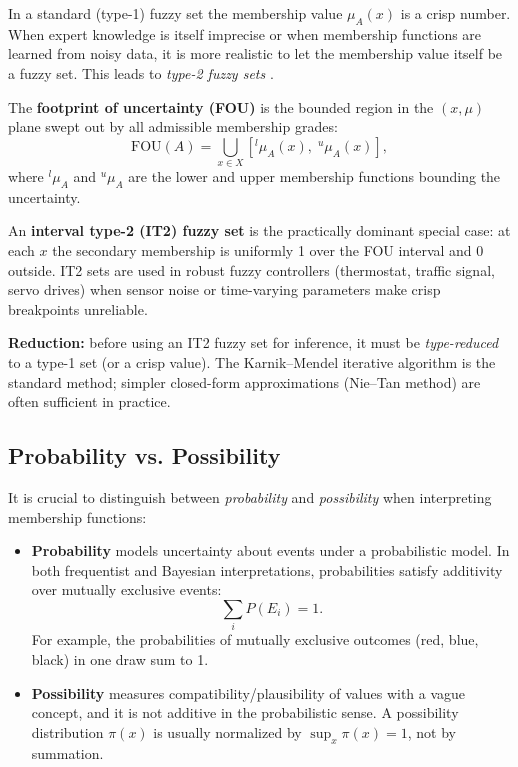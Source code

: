 \begin{tcolorbox}[summarybox, title={Type-2 Fuzzy Sets: handling uncertain membership}]
In a standard (type-1) fuzzy set the membership value \(\mu_A(x)\) is a crisp number. When expert knowledge is itself imprecise or when membership functions are learned from noisy data, it is more realistic to let the membership value itself be a fuzzy set. This leads to \emph{type-2 fuzzy sets} \citep{Zadeh1975}.

The \textbf{footprint of uncertainty (FOU)} is the bounded region in the \((x, \mu)\) plane swept out by all admissible membership grades:
\[
  \text{FOU}(A) = \bigcup_{x \in X} [{}^{l}\mu_A(x),\; {}^{u}\mu_A(x)],
\]
where \({}^{l}\mu_A\) and \({}^{u}\mu_A\) are the lower and upper membership functions bounding the uncertainty.

An \textbf{interval type-2 (IT2) fuzzy set} is the practically dominant special case: at each \(x\) the secondary membership is uniformly 1 over the FOU interval and 0 outside. IT2 sets are used in robust fuzzy controllers (thermostat, traffic signal, servo drives) when sensor noise or time-varying parameters make crisp breakpoints unreliable.

\textbf{Reduction:} before using an IT2 fuzzy set for inference, it must be \emph{type-reduced} to a type-1 set (or a crisp value). The Karnik--Mendel iterative algorithm is the standard method; simpler closed-form approximations (Nie--Tan method) are often sufficient in practice.
\end{tcolorbox}

\subsection{Probability vs. Possibility}
\label{sec:fuzzysets_probability_vs_possibility}

It is crucial to distinguish between \emph{probability} and \emph{possibility} when interpreting membership functions:

\begin{itemize}
    \item \textbf{Probability} models uncertainty about events under a probabilistic model. In both frequentist and Bayesian interpretations, probabilities satisfy additivity over mutually exclusive events:
    \[
    \sum_i P(E_i) = 1.
    \]
    For example, the probabilities of mutually exclusive outcomes (red, blue, black) in one draw sum to 1.

    \item \textbf{Possibility} measures compatibility/plausibility of values with a vague concept, and it is not additive in the probabilistic sense. A possibility distribution \(\pi(x)\) is usually normalized by \(\sup_x \pi(x)=1\), not by summation.
\end{itemize}

